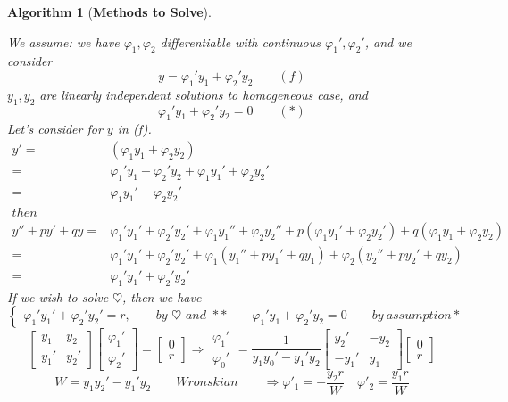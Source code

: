 \documentclass[12pt]{article}
\theoremstyle{plain}
\newtheorem{algorithm}{Algorithm}[subsection]
\renewcommand{\phi}{\varphi}
\begin{document}
\begin{algorithm}[\textbf{Methods to Solve}]
\begin{enumerate}
		We assume: we have $\varphi_1, \varphi_2$ differentiable with continuous
		$\varphi_1', \varphi_2'$, and we consider 
		\[
			y = \varphi_1' y_1 + \varphi_2' y_2 \qquad (f) 
		\]
		$y_1, y_2$ are linearly independent solutions to homogeneous case, and
		\[
			\varphi_1' y_1 + \phi_2'y_2 = 0  \qquad (*)
		\]
		Let's consider for $y$ in (f). 
		\begin{align*}
			y' 
			=& (\varphi_1y_1+\varphi_2y_2) \\
			=& \varphi_1' y_1 + \varphi_2' y_2 + \varphi_1 y_1' +
			\varphi_2 y_2'\\
			=& \varphi_1 y_1' + \varphi_2 y_2' \tag{by (*)} \\
			then \qquad \qquad &\\
			y'' + py' + qy =& \varphi_1'y_1' + \varphi_2'y_2' + \varphi_1y_1''
			+\varphi_2 y_2'' + p(\varphi_1y_1' + \varphi_2 y_2') 
			+ q(\varphi_1y_1 + \varphi_2y_2)\\
			=& \varphi_1'y_1' + \varphi_2'y_2' + \varphi_1(y_1'' + py_1' + qy_1)
			+ \varphi_2(y_2'' + py_2' + qy_2)\\
			=& \varphi_1' y_1' + \varphi_2' y_2' \tag{**}
		\end{align*}
		If we wish to solve $\heartsuit$, then we have 
		\[
			\begin{cases}
				\varphi_1' y_1' + \varphi_2' y_2' = r, \qquad
				by \,\, \heartsuit \,\,  and \,\, **
				\qquad 
				\varphi_1' y_1 + \varphi_2' y_2 = 0 \qquad by \ assumption *
			\end{cases}
		\]
		\[
			\begin{bmatrix}
				y_1 & y_2 \\
				y_1' & y_2'
			\end{bmatrix}
			\begin{bmatrix}
				\varphi_1'\\
				\varphi_2'
			\end{bmatrix}
			=
			\begin{bmatrix}
				0\\
				r
			\end{bmatrix}
			\Rightarrow 
			\begin{matrix}
				\varphi_1' \\
				\varphi_0'
			\end{matrix}
			=\frac1{y_1y_0' - y_1'y_2} 
			\begin{bmatrix}
				y_2' & -y_2\\
				-y_1' & y_1
			\end{bmatrix}
			\begin{bmatrix}
				0\\
				r
			\end{bmatrix}
		\]
		\[
			W = y_1y_2' - y_1'y_2    \qquad Wronskian
			\qquad \Rightarrow 
			\varphi'_1 = -\frac{y_2r}{W}
			\quad \varphi'_2 = \frac{y_1r}{W}
		\]
		

\end{enumerate}
\end{algorithm}
\end{document}
